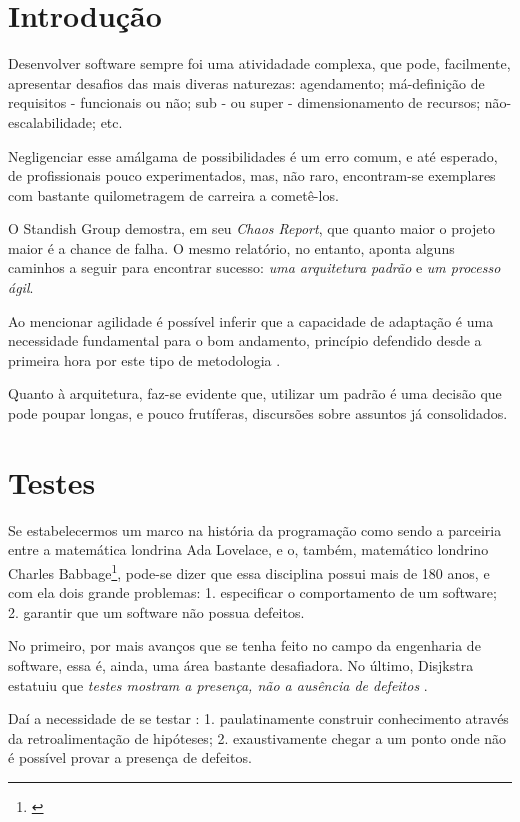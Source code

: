   \section{Introdução}

    Desenvolver software sempre foi uma atividadade complexa, que pode, facilmente,  apresentar desafios das mais diveras naturezas: agendamento; má-definição de  requisitos - funcionais ou não; sub - ou super - dimensionamento de recursos; não-escalabilidade; etc.

    Negligenciar esse amálgama de possibilidades é um erro comum, e até esperado, de profissionais pouco experimentados, mas, não raro, encontram-se exemplares com bastante quilometragem de carreira a cometê-los.

    O Standish Group demostra, em seu \emph{Chaos Report}\cite{ChaosReport2015}, que quanto maior o projeto maior é a chance de falha. O mesmo relatório, no entanto, aponta alguns caminhos a seguir para encontrar sucesso: \emph{uma arquitetura padrão} e \emph{um processo ágil}.

    Ao mencionar agilidade é possível inferir que a capacidade de adaptação é uma  necessidade fundamental para o bom andamento, princípio defendido desde a  primeira hora por este tipo de metodologia \cite{ManifestoAgil2001}.

    Quanto à  arquitetura, faz-se evidente que, utilizar um padrão é uma decisão que  pode poupar longas, e pouco frutíferas, discursões sobre assuntos já consolidados.

  \section{Testes}

    Se estabelecermos um marco na história da programação como sendo a parceiria entre a matemática londrina Ada Lovelace, e o, também, matemático londrino Charles Babbage\footnote{\cite{Huskey1980}}, pode-se dizer que essa disciplina possui mais de 180 anos, e com ela dois grande problemas: 1. especificar o comportamento de um software; 2. garantir que um software não possua defeitos.

    No primeiro, por mais avanços que se tenha feito no campo da engenharia de software, essa é, ainda, uma área bastante desafiadora. No último, Disjkstra estatuiu que \emph{testes mostram a presença, não a ausência de defeitos} \cite[pág. 16]{Nato1969}.

    Daí a necessidade de se testar \cite[pág. xxix-xxx]{Mezaros2007}: 1. paulatinamente construir conhecimento através da retroalimentação de hipóteses; 2. exaustivamente chegar a um ponto onde não é possível provar a presença de defeitos.

